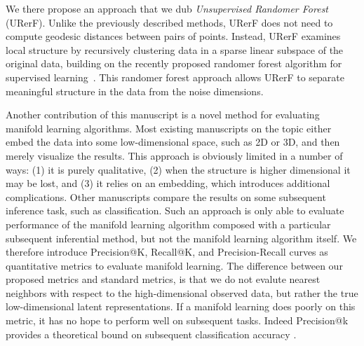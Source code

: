 We there propose an approach that we dub \emph{Unsupervised Randomer Forest} (URerF).
Unlike the previously described methods,
URerF does not need to compute geodesic distances
between pairs of points. Instead,
URerF examines local structure by 
recursively 
 clustering data in a sparse linear subspace of the original data, building on the recently proposed randomer forest algorithm for supervised learning~\cite{tomita2015randomer}.
This randomer forest approach allows URerF
to separate meaningful structure in the
data from the noise dimensions.

Another contribution of this manuscript is a novel method for evaluating manifold learning algorithms.  Most existing manuscripts on the topic either embed the data into some low-dimensional space, such as 2D or 3D, and then merely visualize the results.  This approach is obviously limited in a number of ways: (1) it is purely qualitative, (2) when the structure is higher dimensional it may be lost, and (3) it relies on an embedding, which introduces additional complications.  Other manuscripts compare the results on some subsequent inference task, such as classification.  Such an approach is only able to evaluate performance of the manifold learning algorithm composed with a particular subsequent inferential method, but not the manifold learning algorithm itself.  We therefore introduce Precision@K, Recall@K, and Precision-Recall curves as quantitative metrics to evaluate manifold learning.  The difference between our proposed metrics and standard metrics, is that we do not evalute nearest neighbors with respect to the high-dimensional observed data, but rather the true low-dimensional latent representations.  If a manifold learning does poorly on this metric, it has no hope to perform well on subsequent tasks. Indeed Precision@k provides a theoretical bound on subsequent classification accuracy \cite{Devroye1997-bd}.






% 

